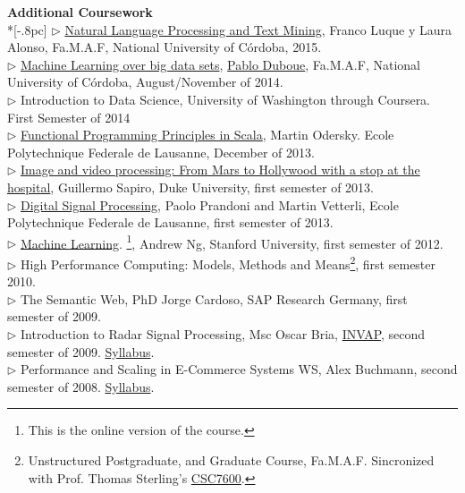 \documentclass[letter,11pt,english]{article}
\begin{document}
{\large \bf Additional Coursework}\\ *[-.8pc]
\underline{\hspace{6in}}
$\triangleright$ \href{http://cs.famaf.unc.edu.ar/wiki/materias/pln}{Natural Language Processing and Text Mining}, Franco Luque y Laura Alonso, Fa.M.A.F, National University of C\'ordoba, 2015.\\
$\triangleright$ \href{http://aprendizajengrande.net/}{Machine Learning over big data sets},  \href{http://duboue.net/}{Pablo Duboue}, Fa.M.A.F, National University of C\'ordoba, August/November of 2014.\\
$\triangleright$ Introduction to Data Science, University of Washington through Coursera. First Semester
of 2014\\
$\triangleright$ \href{https://www.coursera.org/course/progfun}{Functional Programming Principles in Scala},  Martin Odersky. Ecole Polytechnique Federale de Lausanne, December of 2013.  \\
$\triangleright$ \href{https://www.coursera.org/course/images}{Image and video processing: From Mars to Hollywood with a stop at the hospital}, Guillermo Sapiro, Duke University, first semester of 2013. \\
$\triangleright$ \href{https://www.coursera.org/course/dsp}{Digital Signal Processing}, Paolo Prandoni and Martin Vetterli, Ecole Polytechnique Federale de Lausanne, first semester of 2013.\\
$\triangleright$ \href{http://www.ml-class.org}{Machine Learning}. \footnote{This is the online version of the course.}, Andrew Ng, Stanford University, first semester of 2012. \\
$\triangleright$ High Performance Computing: Models, Methods and Means\footnote{Unstructured Postgraduate,
and Graduate Course, Fa.M.A.F. Sincronized with Prof. Thomas Sterling's 
\href{https://www.cct.lsu.edu/csc7600/Home.html}{CSC7600}.}, first semester 2010.\\
$\triangleright$ The Semantic Web, PhD Jorge Cardoso, SAP Research Germany, first semester of 2009.\\
$\triangleright$ Introduction to Radar Signal Processing, Msc Oscar Bria, 
\href{http://www.invap.com.ar/en/}{INVAP}, second semester of 2009. \href{http://postgrado.info.unlp.edu.ar/Cursos/Cursos/11-2011_Introduccion_al_Procesamiento_de_Senales_Radar.pdf}{Syllabus}.\\
$\triangleright$ Performance and Scaling in E-Commerce Systems WS, Alex Buchmann, second semester of 2008. 
\href{http://www.dvs.tu-darmstadt.de/teaching/perf/2008/}{Syllabus}.\\
\end{document}
